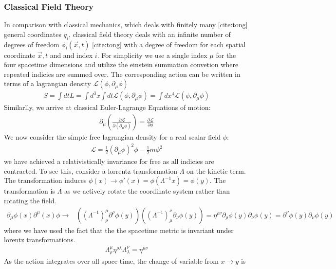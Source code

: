 \subsubsection{Classical Field Theory}
In comparison with classical mechanics, which deals with finitely many [cite:tong] general
 coordinates $q_i$, classical field theory deals with an infinite number of degrees of freedom 
$\phi_i(\vec x, t)$ [cite:tong] with a degree of freedom for each spatial coordinate  $\vec x,t$ and 
and index $i$. For simplicity we use a single index $\mu$ for the four spacetime dimensions and utilize
the einstein summation convetion where repeated indicies are summed over. 
The corresponding action can be written in terms of a lagrangian density $\mathcal{L}(\phi,\partial_\mu \phi)$
\begin{align*}
S = \int dt L = \int d^3x \int dt \mathcal{L}(\phi,\partial_\mu \phi) = \int dx^4 \mathcal{L}(\phi,\partial_\mu \phi)
\end{align*}
Similarlly, we arrive at classical Euler-Lagrange Equations of motion:
\begin{align*}
\partial_\mu \left( \frac{\partial\mathcal{L}}{\partial (\partial_\mu \phi)}\right) = \frac{\partial \mathcal{L}}{\partial\phi}
\end{align*}
We now consider the simple free lagrangian density for a real scalar field $\phi$:
\begin{align*}
\mathcal{L} = \frac{1}{2}(\partial_\mu \phi)^2 \phi - \frac{1}{2} m\phi^2 
\end{align*}
we have achieved a relativistically invariance for free as all indicies are contracted. To see this, consider a lorrentz transformation $\Lambda$ on the kinetic term. The transformation induces $\phi(x) \rightarrow \phi'(x) = \phi(\Lambda^{-1} x) = \phi (y)$. The transformation is $\Lambda$ as we actively
rotate the coordinate system rather than rotating the field. 
\begin{align*} 
\partial_\mu \phi(x) \partial^\mu(x) \phi \rightarrow& ((\Lambda^{-1})^\mu_\rho \partial^\rho \phi (y))( (\Lambda^{-1})_\mu^\nu \partial_\nu \phi (y)) 
= \eta^{\rho\nu} \partial_\rho \phi(y) \partial_\nu \phi (y)
= \partial^\nu \phi(y) \partial_\nu \phi (y)
\end{align*}
where we have used the fact that the the spacetime metric is invariant under lorentz transformations.
\begin{align*}
\Lambda^\mu_\rho \eta^{\rho \lambda} \Lambda_{\lambda}^\nu = \eta^{\mu\nu}
\end{align*}
As the action integrates over all space time, the change of variable from $x\rightarrow y$ is

